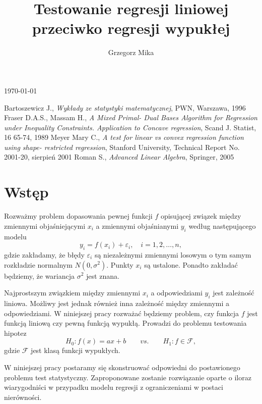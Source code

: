 \documentclass[12pt]{mwart}
\title{Testowanie regresji liniowej przeciwko regresji wypukłej}
\author{Grzegorz Mika}
\begin{document}
\maketitle
\begin{center}
\today
\end{center}
\tableofcontents
\begin{thebibliography}{4}
Bartoszewicz J., \emph{Wykłady ze statystyki matematycznej}, PWN, Warszawa, 1996
Fraser D.A.S., Massam H., \emph{A Mixed Primal- Dual Bases Algorithm for Regression under Inequality Constraints. Application to Concave regression}, Scand J. Statist, 16 65-74, 1989
Meyer Mary C., \emph{A test for linear vs convex regression function using shape- restricted regression}, Stanford University, Technical Report No. 2001-20, sierpień 2001
Roman S., \emph{Advanced Linear Algebra}, Springer, 2005
\end{thebibliography}
\newpage
\section{Wstęp}
Rozważmy problem dopasowania pewnej funkcji $f$ opisującej związek między zmiennymi objaśniejącymi $x_i$ a zmiennymi objaśnianymi $y_i$ według następującego modelu
\begin{displaymath}
y_i=f(x_i)+\varepsilon_i,\quad i=1,2,\dots,n,
\end{displaymath}
gdzie zakładamy, że błędy $\varepsilon_i$ są niezależnymi zmiennymi losowym o tym samym rozkładzie normalnym $N(0,\sigma^2)$. Punkty $x_i$ są ustalone. Ponadto zakładać będziemy, że wariancja $\sigma^2$ jest znana.

Najprostszym związkiem między zmiennymi $x_i$ a odpowiedziami $y_i$ jest zależność liniowa. Możliwy jest jednak również inna zależność między zmiennymi a odpowiedziami. W niniejszej pracy rozważać będziemy problem, czy funkcja $f$ jest funkcją liniową czy pewną funkcją wypukłą. Prowadzi do problemu testowania hipotez
\begin{displaymath}
H_0\colon f(x)=ax+b \qquad vs.\qquad H_1\colon f\in \mathcal{F},
\end{displaymath}
gdzie $\mathcal{F}$ jest klasą funkcji wypukłych.

W niniejszej pracy postaramy się skonstruować odpowiedni do postawionego problemu test statystyczny. Zaproponowane zostanie rozwiązanie oparte o iloraz wiarygodniści w przypadku modelu regresji z ograniczeniami w postaci nierówności.
\end{document}
